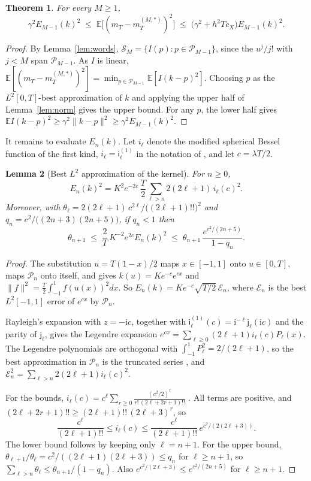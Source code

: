 \documentclass[11pt]{article}
\newtheorem{theorem}{Theorem}
\newtheorem{lemma}[theorem]{Lemma}
\theoremstyle{remark}
\newcommand{\E}{\mathbb{E}}
\begin{document}
\begin{theorem}\label{thm:opt}
For every $M\ge1$,
\[
  \gamma^2E_{M-1}(k)^2\;\le\;\E\big[(m_T-m^{(M,*)}_T)^2\big]\;\le\;\big(\gamma^2+h^2Tc_X\big)E_{M-1}(k)^2 .
\]
\end{theorem}

\begin{proof}
By Lemma~\ref{lem:words}, $\mathcal S_M=\{I(p):p\in\mathcal P_{M-1}\}$, since the $u^j/j!$ with
$j<M$ span $\mathcal P_{M-1}$. As $I$ is linear,
$\E[(m_T-m_T^{(M,*)})^2]=\min_{p\in\mathcal P_{M-1}}\E[I(k-p)^2]$. Choosing $p$ as the $L^2[0,T]$-best
approximation of $k$ and applying the upper half of Lemma~\ref{lem:norm} gives the upper bound.
For any $p$, the lower half gives $\E I(k-p)^2\ge\gamma^2\|k-p\|^2\ge\gamma^2E_{M-1}(k)^2$.
\end{proof}

It remains to evaluate $E_n(k)$. Let $i_\ell$ denote the modified spherical Bessel function of
the first kind, $i_\ell=\mathsf i^{(1)}_\ell$ in the notation of \citet[\S10.47]{dlmf}, and let
$c=\lambda T/2$.

\begin{lemma}[Best $L^2$ approximation of the kernel]\label{lem:legendre}
For $n\ge0$,
\[
  E_n(k)^2=K^2e^{-2c}\,\frac T2\sum_{\ell>n}2(2\ell+1)\,i_\ell(c)^2 .
\]
Moreover, with $\theta_\ell=2(2\ell+1)\,c^{2\ell}/\big((2\ell+1)!!\big)^2$ and
$q_n=c^2/\big((2n+3)(2n+5)\big)$, if $q_n<1$ then
\[
  \theta_{n+1}\;\le\;\frac{2}{T}\,K^{-2}e^{2c}E_n(k)^2\;\le\;\theta_{n+1}\,\frac{e^{c^2/(2n+5)}}{1-q_n}.
\]
\end{lemma}

\begin{proof}
The substitution $u=T(1-x)/2$ maps $x\in[-1,1]$ onto $u\in[0,T]$, maps $\mathcal P_n$ onto itself,
and gives $k(u)=Ke^{-c}e^{cx}$ and $\|f\|^2=\frac T2\int_{-1}^1 f(u(x))^2dx$. So
$E_n(k)=Ke^{-c}\sqrt{T/2}\,\mathcal E_n$, where $\mathcal E_n$ is the best $L^2[-1,1]$ error of
$e^{cx}$ by $\mathcal P_n$.

Rayleigh's expansion \citep[eq.~10.60.7]{dlmf} with $z=-\mathrm ic$, together with
$\mathsf i^{(1)}_\ell(c)=\mathrm i^{-\ell}\mathsf j_\ell(\mathrm ic)$ \citep[eq.~10.47.12]{dlmf}
and the parity of $\mathsf j_\ell$, gives the Legendre expansion
$e^{cx}=\sum_{\ell\ge0}(2\ell+1)i_\ell(c)P_\ell(x)$. The Legendre polynomials are orthogonal with
$\int_{-1}^1P_\ell^2=2/(2\ell+1)$, so the best approximation in $\mathcal P_n$ is the truncated series
\citep[Ch.~17]{trefethen2019}, and $\mathcal E_n^2=\sum_{\ell>n}2(2\ell+1)i_\ell(c)^2$.

For the bounds, $i_\ell(c)=c^\ell\sum_{r\ge0}\frac{(c^2/2)^r}{r!\,(2\ell+2r+1)!!}$
\citep[eq.~10.53.3]{dlmf}. All terms are positive, and $(2\ell+2r+1)!!\ge(2\ell+1)!!\,(2\ell+3)^r$, so
\[
  \frac{c^\ell}{(2\ell+1)!!}\le i_\ell(c)\le\frac{c^\ell}{(2\ell+1)!!}\,e^{c^2/(2(2\ell+3))}.
\]
The lower bound follows by keeping only $\ell=n+1$. For the upper bound, $\theta_{\ell+1}/\theta_\ell=c^2/((2\ell+1)(2\ell+3))\le q_n$
for $\ell\ge n+1$, so $\sum_{\ell>n}\theta_\ell\le\theta_{n+1}/(1-q_n)$. Also
$e^{c^2/(2\ell+3)}\le e^{c^2/(2n+5)}$ for $\ell\ge n+1$.
\end{proof}
\end{document}
